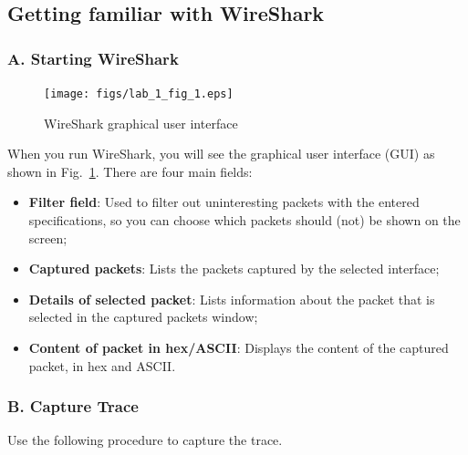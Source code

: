 \subsection{Getting familiar with WireShark}
\subsubsection{A. Starting WireShark}
\begin{figure}[!t]
\centering
 \texttt{[image: figs/lab\_1\_fig\_1.eps]}
  \caption{WireShark graphical user interface}\label{lab_1_fig_1}
\end{figure}

When you run WireShark, you will see the graphical user interface (GUI) as
shown in Fig.~\ref{lab_1_fig_1}. There are four main fields:
\begin{itemize}
\item \textbf{Filter field}: Used to filter out uninteresting packets
  with the entered specifications, so you can choose which packets
  should (not) be shown on the screen;
\item \textbf{Captured packets}: Lists the packets captured by the
  selected interface;
\item \textbf{Details of selected packet}: Lists information about the
  packet that is selected in the captured packets window;
\item \textbf{Content of packet in hex/ASCII}: Displays the content of
  the captured packet, in hex and ASCII.
\end{itemize}

\subsubsection{B. Capture Trace}

Use the following procedure to capture the trace.


